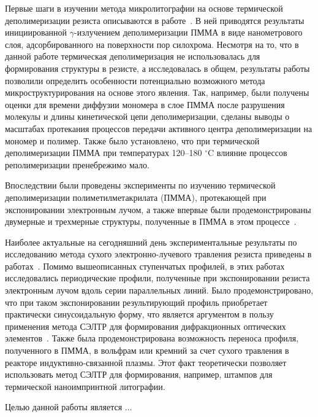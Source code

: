 \previouswork

Первые шаги в изучении метода микролитографии на основе термической деполимеризации резиста описываются в работе~\cite{Bruk_2000}. В ней приводятся результаты инициированной $\gamma$-излучением деполимеризации ПММА в виде нанометрового слоя, адсорбированного на поверхности пор силохрома. Несмотря на то, что в данной работе термическая деполимеризация не использовалась для формирования структуры в резисте, а исследовалась в общем, результаты работы позволили определить особенности потенциально возможного метода микроструктурирования на основе этого явления. Так, например, были получены оценки для времени диффузии мономера в слое ПММА после разрушения молекулы и длины кинетической цепи деполимеризации, сделаны выводы о масштабах протекания процессов передачи активного центра деполимеризации на мономер и полимер. Также было установлено, что при термической деполимеризации ПММА при температурах 120--180 $^\circ$C влияние процессов реполимеризации пренебрежимо мало.

Впоследствии были проведены эксперименты по изучению термической деполимеризации полиметилметакрилата (ПММА), протекающей при экспонировании электронным лучом, а также впервые были продемонстрированы двумерные и трехмерные структуры, полученные в ПММА в этом процессе~\cite{Bruk_2013}.

Наиболее актуальные на сегодняшний день экспериментальные результаты по исследованию метода сухого электронно-лучевого травления резиста приведены в работах~\cite{Bruk_2015_co, Bruk_2016_mee}. Помимо вышеописанных ступенчатых профилей, в этих работах исследовались периодические профили, полученные при экспонировании резиста электронным лучом вдоль серии параллельных линий. Было продемонстрировано, что при таком экспонировании результирующий профиль приобретает практически синусоидальную форму, что является аргументом в пользу применения метода СЭЛТР для формирования дифракционных оптических элементов~\cite{Mitreska_sin_gratings}. Также была продемонстрирована возможность переноса профиля, полученного в ПММА, в вольфрам или кремний за счет сухого травления в реакторе индуктивно-связанной плазмы. Этот факт теоретически позволяет использовать метод СЭЛТР для формирования, например, штампов для термической наноимпринтной литографии.


\aimsandtasks

Целью данной работы является ...

